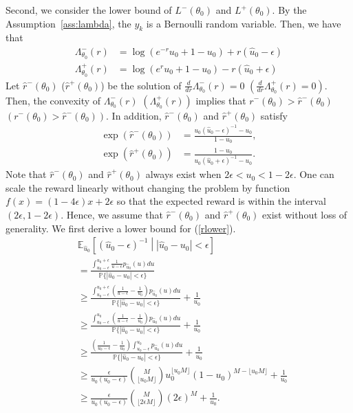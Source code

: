 \documentclass[letterpaper]{article} %
\begin{document}
Second, we consider the lower bound of $L^-(\theta_0)$ and $L^+(\theta_0)$. By the Assumption~\ref{ass:lambda}, the $y_k$ is a Bernoulli random variable. Then, we have that
\begin{align}
\Lambda_{\theta_0}^-(r)&=\log(e^{-r}u_0+1-u_0)+r(\hat{u}_0-\epsilon)\\
\Lambda_{\theta_0}^+(r)&=\log(e^{r}u_0+1-u_0)-r(\hat{u}_0+\epsilon)
\end{align}
Let $\hat{r}^-(\theta_0)$ ($\hat{r}^+(\theta_0)$) be the solution of $\frac{d}{dr}\Lambda^-_{\theta_0}(r)=0$ $\left(\frac{d}{dr}\Lambda^+_{\theta_0}(r)=0\right)$. Then, the convexity of $\Lambda_{\theta_0}^-(r)$ $\left(\Lambda_{\theta_0}^+(r)\right)$ implies that $r^-(\theta_0)>\hat{r}^-(\theta_0)$ $\left(r^-(\theta_0)>\hat{r}^-(\theta_0)\right)$. In addition, $\hat{r}^-(\theta_0)$ and $\hat{r}^+(\theta_0)$ satisfy
\begin{align}\label{rlower}
\exp(\hat{r}^-(\theta_0))&=\frac{u_0(\hat{u}_0-\epsilon)^{-1}-u_0}{1-u_0},\\\label{rupper}
\exp(\hat{r}^+(\theta_0))&=\frac{1-u_0}{u_0(\hat{u}_0+\epsilon)^{-1}-u_0}.
\end{align} 
Note that $\hat{r}^-(\theta_0)$ and $\hat{r}^+(\theta_0)$ always exist when $2\epsilon<u_0<1-2\epsilon$. One can scale the reward linearly without changing the problem by function $f(x)=(1-4\epsilon)x+2\epsilon$ so that the expected reward is within the interval $(2\epsilon,1-2\epsilon)$. Hence, we assume that $\hat{r}^-(\theta_0)$ and $\hat{r}^+(\theta_0)$ exist without loss of generality. We first derive a lower bound for (\ref{rlower}).
\begin{align}
&\mathbb{E}_{\hat{u}_0} \left[(\hat{u}_0-\epsilon)^{-1}\middle||\hat{u}_0-u_0|<\epsilon\right]\\
&=\frac{\int_{u_0-\epsilon}^{u_0+\epsilon}\frac{1}{u-\epsilon}p_{\hat{u}_0}(u)du}{\mathbb{P}\{|\hat{u}_0-u_0|<\epsilon\}}\\
&\geq \frac{\int_{u_0-\epsilon}^{u_0+\epsilon}\left(\frac{1}{u-\epsilon}-\frac{1}{u_0}\right)p_{\hat{u}_0}(u)du}{\mathbb{P}\{|\hat{u}_0-u_0|<\epsilon\}}+\frac{1}{u_0}\\
&\geq \frac{\int_{u_0-\epsilon}^{u_0}\left(\frac{1}{u-\epsilon}-\frac{1}{u_0}\right)p_{\hat{u}_0}(u)du}{\mathbb{P}\{|\hat{u}_0-u_0|<\epsilon\}}+\frac{1}{u_0}\\
&\geq \frac{\left(\frac{1}{u_0-\epsilon}-\frac{1}{u_0}\right)\int_{u_0-\epsilon}^{u_0}p_{\hat{u}_0}(u)du}{\mathbb{P}\{|\hat{u}_0-u_0|<\epsilon\}}+\frac{1}{u_0}\\
&\geq\frac{\epsilon}{u_0(u_0 \!-\!\epsilon)}\binom{M}{\lfloor u_0M\rfloor}u_0^{\lfloor u_0M\rfloor}(1\!-\! u_0)^{M-{\lfloor u_0M\rfloor}}+\frac{1}{u_0}\\
&\geq\frac{\epsilon}{u_0(u_0-\epsilon)}\binom{M}{\lfloor 2\epsilon M\rfloor}(2\epsilon)^M+\frac{1}{u_0}.
\end{align}
\end{document}
